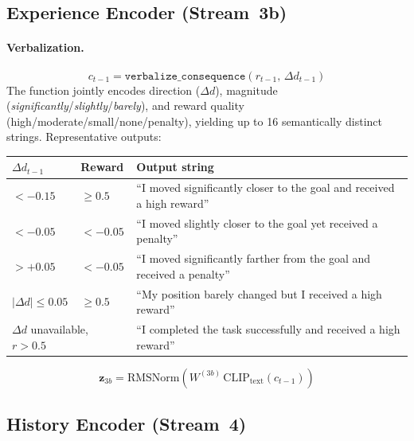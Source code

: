 \documentclass{article}
\renewcommand{\arraystretch}{1.25}
\begin{document}
\subsection{Experience Encoder (Stream~3b)}
\label{sec:experience}
\label{sec:consequence}

\paragraph{Verbalization.}
\begin{equation}
  c_{t-1} = \texttt{verbalize\_consequence}(r_{t-1},\,\Delta d_{t-1})
\end{equation}
The function jointly encodes direction ($\Delta d$), magnitude
(\textit{significantly}/\textit{slightly}/\textit{barely}), and reward quality
(high/moderate/small/none/penalty), yielding up to 16 semantically distinct
strings. Representative outputs:

\vspace{4pt}
\begin{center}
\small
\renewcommand{\arraystretch}{1.15}
\begin{tabular}{lll}
\toprule
$\Delta d_{t-1}$ & Reward & Output string \\
\midrule
$<{-}0.15$ & ${\ge}0.5$   & ``I moved significantly closer to the goal and received a high reward'' \\
$<{-}0.05$ & ${<}{-}0.05$ & ``I moved slightly closer to the goal yet received a penalty'' \\
$>{+}0.05$ & ${<}{-}0.05$ & ``I moved significantly farther from the goal and received a penalty'' \\
$|\Delta d|\le0.05$ & ${\ge}0.5$ & ``My position barely changed but I received a high reward'' \\
\multicolumn{2}{l}{$\Delta d$ unavailable, $r{>}0.5$} & ``I completed the task successfully and received a high reward'' \\
\bottomrule
\end{tabular}
\end{center}
\vspace{4pt}

\begin{equation}
  \mathbf{z}_{3b} = \mathrm{RMSNorm}(W^{(3b)}\,\mathrm{CLIP}_{\mathrm{text}}(c_{t-1}))
  \label{eq:experience_enc}
\end{equation}

\subsection{History Encoder (Stream~4)}
\end{document}
